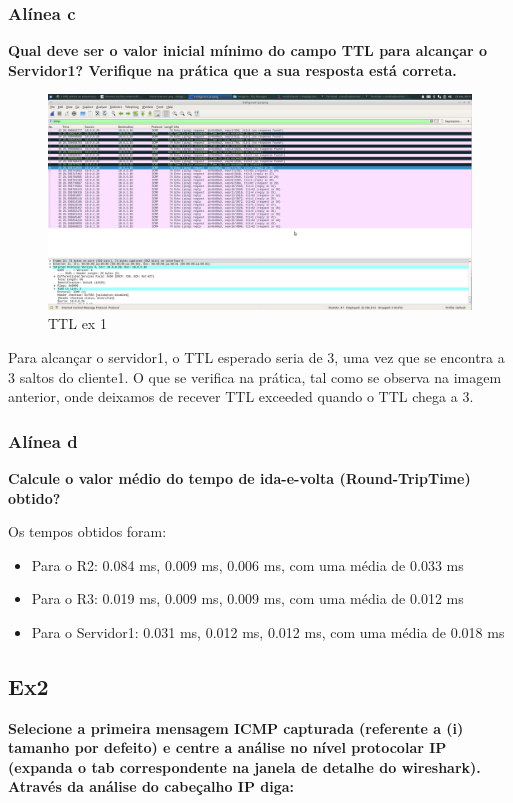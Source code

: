 \documentclass{article}
\begin{document}
\subsubsection{Alínea c}
\textbf{Qual deve ser o valor inicial mínimo do campo TTL para alcançar o Servidor1? Verifique na prática que a sua resposta está correta.}\\\par
\begin{figure}[h]
	\centering
	\includegraphics[scale = 0.2]{ttl-ex1.png}
	\caption{TTL ex 1}
\end{figure}
Para alcançar o servidor1, o TTL esperado seria de 3, uma vez que se encontra a 3 saltos do cliente1. O que se verifica na prática, tal como se observa na imagem anterior, onde deixamos de recever TTL exceeded quando o TTL chega a 3.

\subsubsection{Alínea d}	
\textbf{Calcule o valor médio do tempo de ida-e-volta (Round-TripTime) obtido?}\\\par
Os tempos obtidos foram:

\begin{itemize}
	\item Para o R2: 0.084 ms, 0.009 ms, 0.006 ms, com uma média de 0.033 ms
	\item Para o R3: 0.019 ms, 0.009 ms, 0.009 ms, com uma média de 0.012 ms
	\item Para o Servidor1: 0.031 ms, 0.012 ms, 0.012 ms, com uma média de 0.018 ms
\end{itemize}

\subsection{Ex2}
\textbf{Selecione a primeira mensagem ICMP capturada (referente a (i) tamanho por defeito) e centre a análise no nível protocolar IP (expanda o tab correspondente na janela de detalhe do wireshark). Através da análise do cabeçalho IP diga:}
\end{document}
